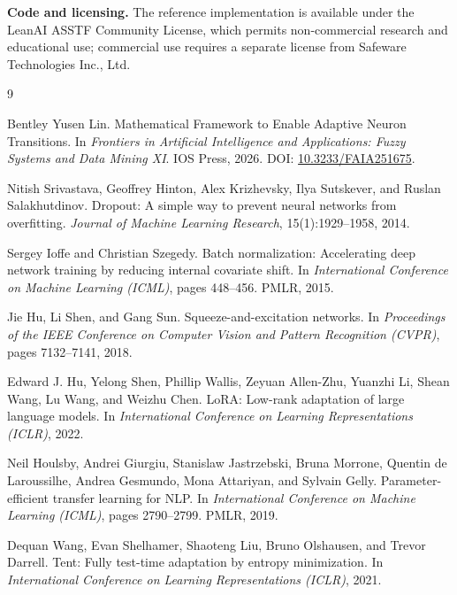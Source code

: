 \documentclass[11pt,a4paper]{article}
\theoremstyle{definition}
\begin{document}
\textbf{Code and licensing.} The reference implementation is available under the LeanAI ASSTF Community License, which permits non-commercial research and educational use; commercial use requires a separate license from Safeware Technologies Inc., Ltd.

\begin{thebibliography}{9}

Bentley Yusen Lin.
Mathematical Framework to Enable Adaptive Neuron Transitions.
In \textit{Frontiers in Artificial Intelligence and Applications: Fuzzy Systems and Data Mining XI}. IOS Press, 2026.
DOI: \href{https://doi.org/10.3233/FAIA251675}{10.3233/FAIA251675}.

Nitish Srivastava, Geoffrey Hinton, Alex Krizhevsky, Ilya Sutskever, and Ruslan Salakhutdinov.
Dropout: A simple way to prevent neural networks from overfitting.
\textit{Journal of Machine Learning Research}, 15(1):1929--1958, 2014.

Sergey Ioffe and Christian Szegedy.
Batch normalization: Accelerating deep network training by reducing internal covariate shift.
In \textit{International Conference on Machine Learning (ICML)}, pages 448--456. PMLR, 2015.

Jie Hu, Li Shen, and Gang Sun.
Squeeze-and-excitation networks.
In \textit{Proceedings of the IEEE Conference on Computer Vision and Pattern Recognition (CVPR)}, pages 7132--7141, 2018.

Edward J. Hu, Yelong Shen, Phillip Wallis, Zeyuan Allen-Zhu, Yuanzhi Li, Shean Wang, Lu Wang, and Weizhu Chen.
LoRA: Low-rank adaptation of large language models.
In \textit{International Conference on Learning Representations (ICLR)}, 2022.

Neil Houlsby, Andrei Giurgiu, Stanislaw Jastrzebski, Bruna Morrone, Quentin de Laroussilhe, Andrea Gesmundo, Mona Attariyan, and Sylvain Gelly.
Parameter-efficient transfer learning for NLP.
In \textit{International Conference on Machine Learning (ICML)}, pages 2790--2799. PMLR, 2019.

Dequan Wang, Evan Shelhamer, Shaoteng Liu, Bruno Olshausen, and Trevor Darrell.
Tent: Fully test-time adaptation by entropy minimization.
In \textit{International Conference on Learning Representations (ICLR)}, 2021.


\end{thebibliography}
\end{document}
